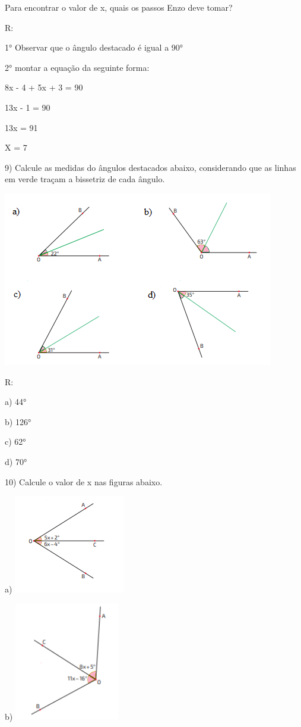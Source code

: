 Para encontrar o valor de x, quais os passos Enzo deve tomar?

R:

1° Observar que o ângulo destacado é igual a 90°

2° montar a equação da seguinte forma:

8x - 4 + 5x + 3 = 90

13x - 1 = 90

13x = 91

X = 7

9) Calcule as medidas do ângulos destacados abaixo, considerando que as
linhas em verde traçam a bissetriz de cada ângulo.

\includegraphics[width=4.66667in,height=3in]{./imgSAEB_8_MAT/media/image32.png}

R:

a) 44°

b) 126°

c) 62°

d) 70°

10) Calcule o valor de x nas figuras abaixo.

a)
\includegraphics[width=1.91667in,height=1.6875in]{./imgSAEB_8_MAT/media/image33.png}

b)
\includegraphics[width=1.80208in,height=2.02917in]{./imgSAEB_8_MAT/media/image34.png}

